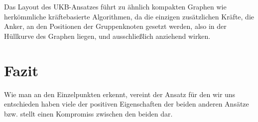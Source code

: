 Das Layout des UKB-Ansatzes führt zu ähnlich kompakten Graphen wie herkömmliche kräftebasierte Algorithmen, da die einzigen zusätzlichen Kräfte, die Anker, an den Positionen der Gruppenknoten gesetzt werden, also in der Hüllkurve des Graphen liegen, und ausschließlich anziehend wirken.

\section*{Fazit}
Wie man an den Einzelpunkten erkennt, vereint der Ansatz für den wir uns entschieden haben viele der positiven Eigenschaften der beiden anderen Ansätze bzw. stellt einen Kompromiss zwischen den beiden dar.
% 
